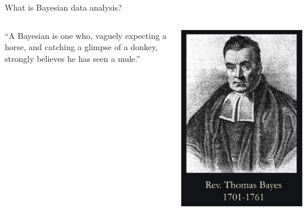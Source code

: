 \documentclass[12pt, aspectratio=149]{beamer}
\theoremstyle{plain}
\begin{document}
\begin{frame}[fragile]{What is Bayesian data analysis?}
	\begin{columns}
		\begin{column}{0.7\linewidth}
			``A Bayesian is one who, vaguely expecting a horse, and catching a glimpse of a donkey, strongly believes he has seen a mule.''
		\end{column}
		\begin{column}{0.3\linewidth}
			\includegraphics[height=0.7\textheight]{figs/bayes.png}
		\end{column}
	\end{columns}
\end{frame}
\end{document}
